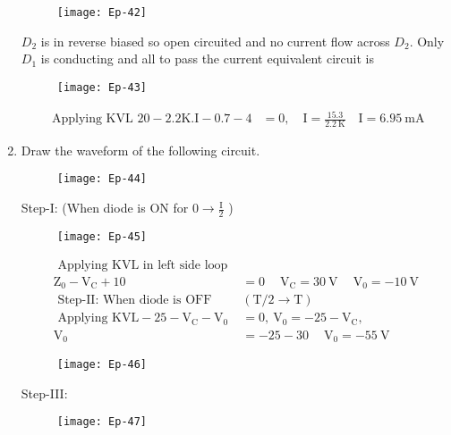 \begin{enumerate}
	\begin{figure}[H]
		\centering
		\texttt{[image: Ep-42]}
	\end{figure}
	\begin{answer}
		$D_{2}$ is in reverse biased so open circuited and no current flow across $D_{2} .$ Only $D_{1}$ is conducting and all to pass the current equivalent circuit is
		\begin{figure}[H]
			\centering
			\texttt{[image: Ep-43]}
		\end{figure}
		\begin{align*}
		\text { Applying KVL } 20-2.2 \mathrm{K.I}-0.7-4&=0, \quad \mathrm{I}=\frac{15.3}{2.2 \mathrm{~K}} \quad \mathrm{I}=6.95 \mathrm{~mA}
		\end{align*}
	\end{answer}
	\item Draw the waveform of the following circuit.
	\begin{figure}[H]
		\centering
		\texttt{[image: Ep-44]}
	\end{figure}
	\begin{answer}
		Step-I: (When diode is ON for $0 \rightarrow \frac{\mathrm{I}}{2}$ )
		\begin{figure}[H]
			\centering
			\texttt{[image: Ep-45]}
		\end{figure}
		\begin{align*}
		\text { Applying KVL in left side loop }&\\
		\mathrm{Z}_{0}-\mathrm{V}_{\mathrm{C}}+10&=0 \quad \mathrm{~V}_{\mathrm{C}}=30 \mathrm{~V} \quad \mathrm{~V}_{0}=-10 \mathrm{~V}\\
		\text { Step-II: When diode is OFF }&(\mathrm{T} / 2 \rightarrow \mathrm{T})\\
		\text { Applying } \mathrm{KVL}-25-\mathrm{V}_{\mathrm{C}}-\mathrm{V}_{0}&=0, \mathrm{~V}_{0}=-25-\mathrm{V}_{\mathrm{C}} \text {, }\\
		\mathrm{V}_{0}&=-25-30 \quad \mathrm{~V}_{0}=-55 \mathrm{~V}
		\end{align*}
		\begin{figure}[H]
			\centering
			\texttt{[image: Ep-46]}
		\end{figure}
	Step-III:
		\begin{figure}[H]
		\centering
		\texttt{[image: Ep-47]}
	\end{figure}
	\end{answer}

\end{enumerate}
